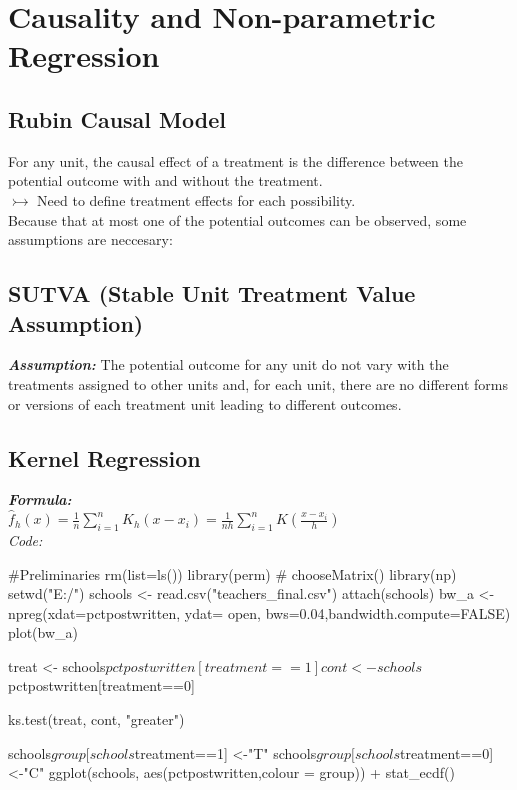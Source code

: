 \section{Causality and Non-parametric Regression}
\subsection*{Rubin Causal Model}
For any unit, the causal effect of a treatment is the difference between the potential outcome with and without the treatment. \\
$\rightarrowtail$ Need to define treatment effects for each possibility. \\
Because that at most one of the potential outcomes can be observed, some assumptions are neccesary: 
\subsection*{SUTVA (Stable Unit Treatment Value Assumption)}
\textbf{\textit{Assumption: }}The potential outcome for any unit do not vary with the treatments assigned to other units and, for each unit, there are no different forms or versions of each treatment unit leading to different outcomes. 
\subsection*{Kernel Regression}
\textbf{\textit{Formula: }} \\
$\hat{f}_h(x) = \frac{1}{n} \sum_{i=1}^{n} K_h(x-x_i) = \frac{1}{nh}\sum_{i=1}^{n} K(\frac{x-x_i}{h})$ \\
\textit{Code: }
\begin{spverbatim}
#Preliminaries
rm(list=ls())
library(perm) # chooseMatrix()
library(np)
setwd("E:/")
schools <- read.csv("teachers_final.csv")
attach(schools)
bw_a <-npreg(xdat=pctpostwritten, ydat= open, bws=0.04,bandwidth.compute=FALSE)
plot(bw_a)


treat <- schools$pctpostwritten[treatment==1]
cont <- schools$pctpostwritten[treatment==0]

ks.test(treat, cont, "greater")

schools$group[schools$treatment==1] <-"T"
schools$group[schools$treatment==0] <-"C"
ggplot(schools, aes(pctpostwritten,colour = group)) + stat_ecdf()
\end{spverbatim}